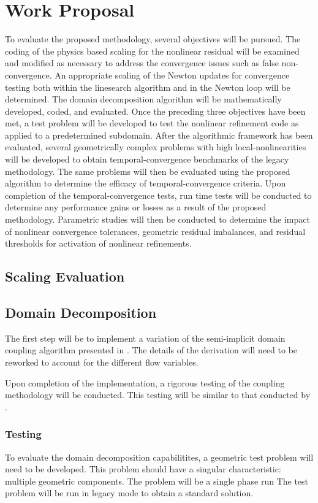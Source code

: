 \chapter{Work Proposal}
\label{chap:proposal}
To evaluate the proposed methodology, several objectives will be pursued.
The coding of the physics based scaling for the nonlinear residual will be examined and modified as necessary to address the convergence issues such as false non-convergence.
An appropriate scaling of the Newton updates for convergence testing both within the linesearch algorithm and in the Newton loop will be determined.
The domain decomposition algorithm will be mathematically developed, coded, and evaluated.
Once the preceding three objectives have been met, a test problem will be developed to test the nonlinear refinement code as applied to a predetermined subdomain.
After the algorithmic framework has been evaluated, several geometrically complex problems with high local-nonlinearities will be developed to obtain temporal-convergence benchmarks of the legacy methodology.
The same problems will then be evaluated using the proposed algorithm to determine the efficacy of temporal-convergence criteria.
Upon completion of the temporal-convergence tests, run time tests will be conducted to determine any performance gains or losses as a result of the proposed methodology.
Parametric studies will then be conducted to determine the impact of nonlinear convergence tolerances, geometric residual imbalances, and residual thresholds for activation of nonlinear refinements.

\section{Scaling Evaluation}
\label{sect:proposal_scaling}


\section{Domain Decomposition}
\label{sect:domain_coupling}
The first step will be to implement a variation of the semi-implicit domain coupling algorithm presented in .
The details of the derivation will need to be reworked to account for the different flow variables.

Upon completion of the implementation, a rigorous testing of the coupling methodology will be conducted.
This testing will be similar to that conducted by \citet{Weaver2002}.

\subsection{Testing}
\label{subsect:domain_testing}
To evaluate the domain decomposition capabilitites, a geometric test problem will need to be developed.
This problem should have a singular characteristic: multiple geometric components.
The problem will be a single phase run
The test problem will be run in legacy mode to obtain a standard solution.


